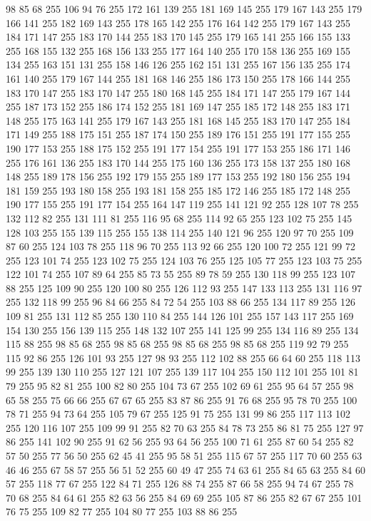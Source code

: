 98 85 68 255 106 94 76 255 172 161 139 255 181 169 145 255 179 167 143 255 179 166 141 255 182 169 143 255 178 165 142 255 176 164 142 255 179 167 143 255 184 171 147 255 183 170 144 255 183 170 145 255 179 165 141 255 166 155 133 255 168 155 132 255 168 156 133 255 177 164 140 255 170 158 136 255 169 155 134 255 163 151 131 255 158 146 126 255 162 151 131 255 167 156 135 255 174 161 140 255 179 167 144 255 181 168 146 255 186 173 150 255 178 166 144 255 183 170 147 255 183 170 147 255 180 168 145 255 184 171 147 255 179 167 144 255 187 173 152 255 186 174 152 255 181 169 147 255 185 172 148 255 183 171 148 255 175 163 141 255 179 167 143 255 181 168 145 255 183 170 147 255 184 171 149 255 188 175 151 255 187 174 150 255 189 176 151 255 191 177 155 255 190 177 153 255 188 175 152 255 191 177 154 255 191 177 153 255 186 171 146 255 176 161 136 255 183 170 144 255 175 160 136 255 173 158 137 255 180 168 148 255 189 178 156 255 192 179 155 255 189 177 153 255 192 180 156 255 194 181 159 255 193 180 158 255
193 181 158 255 185 172 146 255 185 172 148 255 190 177 155 255 191 177 154 255 164 147 119 255 141 121 92 255 128 107 78 255 132 112 82 255 131 111 81 255 116 95 68 255 114 92 65 255 123 102 75 255 145 128 103 255 155 139 115 255 155 138 114 255 140 121 96 255 120 97 70 255 109 87 60 255 124 103 78 255 118 96 70 255 113 92 66 255 120 100 72 255 121 99 72 255 123 101 74 255 123 102 75 255 124 103 76 255 125 105 77 255 123 103 75 255 122 101 74 255 107 89 64 255 85 73 55 255 89 78 59 255 130 118 99 255 123 107 88 255 125 109 90 255 120 100 80 255 126 112 93 255 147 133 113 255 131 116 97 255 132 118 99 255 96 84 66 255 84 72 54 255 103 88 66 255 134 117 89 255 126 109 81 255 131 112 85 255 130 110 84 255 144 126 101 255 157 143 117 255 169 154 130 255 156 139 115 255 148 132 107 255 141 125 99 255 134 116 89 255 134 115 88 255 98 85 68 255 98 85 68 255 98 85 68 255 98 85 68 255 119 92 79 255 115 92 86 255 126 101 93 255 127 98 93 255
112 102 88 255 66 64 60 255 118 113 99 255 139 130 110 255 127 121 107 255 139 117 104 255 150 112 101 255 101 81 79 255 95 82 81 255 100 82 80 255 104 73 67 255 102 69 61 255 95 64 57 255 98 65 58 255 75 66 66 255 67 67 65 255 83 87 86 255 91 76 68 255 95 78 70 255 100 78 71 255 94 73 64 255 105 79 67 255 125 91 75 255 131 99 86 255 117 113 102 255 120 116 107 255 109 99 91 255 82 70 63 255 84 78 73 255 86 81 75 255 127 97 86 255 141 102 90 255 91 62 56 255 93 64 56 255 100 71 61 255 87 60 54 255 82 57 50 255 77 56 50 255 62 45 41 255 95 58 51 255 115 67 57 255 117 70 60 255 63 46 46 255 67 58 57 255 56 51 52 255 60 49 47 255 74 63 61 255 84 65 63 255 84 60 57 255 118 77 67 255 122 84 71 255 126 88 74 255 87 66 58 255 94 74 67 255 78 70 68 255 84 64 61 255 82 63 56 255 84 69 69 255 105 87 86 255 82 67 67 255 101 76 75 255 109 82 77 255 104 80 77 255 103 88 86 255
